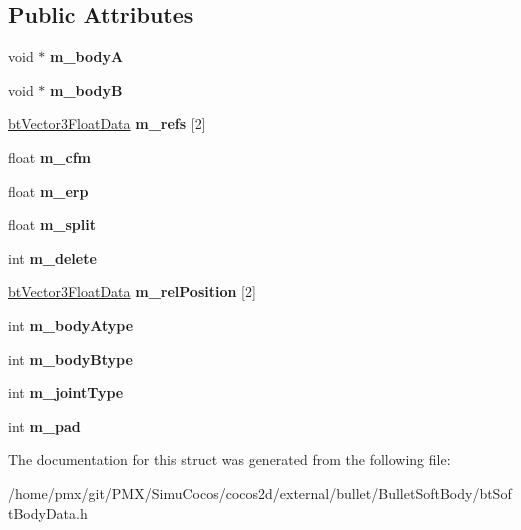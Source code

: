 \subsection*{Public Attributes}
\begin{DoxyCompactItemize}
\item 
\mbox{\label{structbtSoftBodyJointData_aa0c5fe576669547704c7e97a11fa1b79}} 
void $\ast$ {\bfseries m\+\_\+bodyA}
\item 
\mbox{\label{structbtSoftBodyJointData_a4db68941d63ea7141412ce8582d1346b}} 
void $\ast$ {\bfseries m\+\_\+bodyB}
\item 
\mbox{\label{structbtSoftBodyJointData_a317d5254a5a5bb919d1780caabad226a}} 
\hyperlink{structbtVector3FloatData}{bt\+Vector3\+Float\+Data} {\bfseries m\+\_\+refs} \mbox{[}2\mbox{]}
\item 
\mbox{\label{structbtSoftBodyJointData_a277938182c7715a1e9d25a4d5c4a4883}} 
float {\bfseries m\+\_\+cfm}
\item 
\mbox{\label{structbtSoftBodyJointData_a01f10d72c14307a7fbe04cac64457a15}} 
float {\bfseries m\+\_\+erp}
\item 
\mbox{\label{structbtSoftBodyJointData_a8eb9aaf8d03ec99c8d36f9a16d62d075}} 
float {\bfseries m\+\_\+split}
\item 
\mbox{\label{structbtSoftBodyJointData_a38653218fd5c6b336e66564d7e433e52}} 
int {\bfseries m\+\_\+delete}
\item 
\mbox{\label{structbtSoftBodyJointData_a3253593e164dccf56f61a473ecd24549}} 
\hyperlink{structbtVector3FloatData}{bt\+Vector3\+Float\+Data} {\bfseries m\+\_\+rel\+Position} \mbox{[}2\mbox{]}
\item 
\mbox{\label{structbtSoftBodyJointData_a496ebce7c9805781d14f941986ac5feb}} 
int {\bfseries m\+\_\+body\+Atype}
\item 
\mbox{\label{structbtSoftBodyJointData_a13ea08e1cfa0ebbe7f4e7bb4b3147e69}} 
int {\bfseries m\+\_\+body\+Btype}
\item 
\mbox{\label{structbtSoftBodyJointData_ab0620ed64c79d8abdbcd3ed739e7a0c3}} 
int {\bfseries m\+\_\+joint\+Type}
\item 
\mbox{\label{structbtSoftBodyJointData_a536a5b93ea0375611ac457085d63dd7c}} 
int {\bfseries m\+\_\+pad}
\end{DoxyCompactItemize}


The documentation for this struct was generated from the following file\+:\begin{DoxyCompactItemize}
\item 
/home/pmx/git/\+P\+M\+X/\+Simu\+Cocos/cocos2d/external/bullet/\+Bullet\+Soft\+Body/bt\+Soft\+Body\+Data.\+h\end{DoxyCompactItemize}
